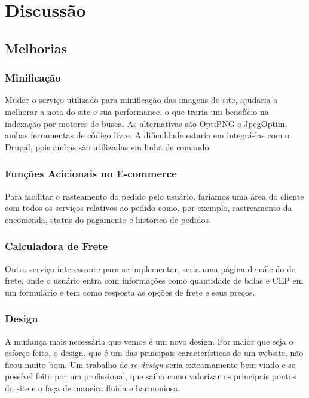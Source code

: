\chapter{Discussão}

\section{Melhorias}

\subsection{Minificação}
Mudar o serviço utilizado para minificação das imagens do site, ajudaria a melhorar a nota do site e sua performance, o que traria um benefício na indexação por motores de busca. As alternativas são OptiPNG e JpegOptim, ambas ferramentas de código livre. A dificuldade estaria em integrá-las com o Drupal, pois ambas são utilizadas em linha de comando.

\subsection{Funções Acicionais no E-commerce}
Para facilitar o rasteamento do pedido pelo usuário, fariamos uma área do cliente com todos os serviços relativos ao pedido como, por exemplo, rastreamento da encomenda, status do pagamento e histórico de pedidos.

\subsection{Calculadora de Frete}
Outro serviço interessante para se implementar, seria uma página de cálculo de frete, onde o usuário entra com informações como quantidade de balas e CEP em um formulário e tem como resposta as opções de frete e seus preços.

\subsection{Design}
A mudança mais necessária que vemos é um novo design. Por maior que seja o esforço feito, o design, que é um das principais características de um website, não ficou muito bom. Um trabalho de \textit{re-design} seria extramamente bem vindo e se possível feito por um profissional, que saiba como valorizar os principais pontos do site e o faça de maneira fluida e harmoniosa.
